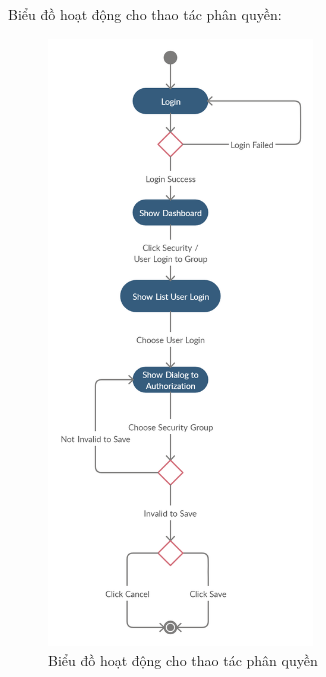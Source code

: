 Biểu đồ hoạt động cho thao tác phân quyền:
\begin{figure}[H]
\centering
\includegraphics[width=7cm]
{images/activity-diagram/assign-permissions.png}
\caption{Biểu đồ hoạt động cho thao tác phân quyền}
\end{figure}




